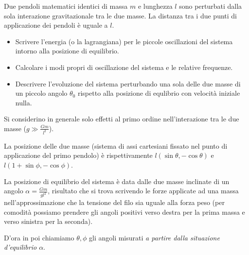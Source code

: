 \documentclass[../main.tex]{subfiles}
\begin{document}
\textex
Due pendoli matematici identici di massa $m$ e lunghezza $l$ sono perturbati dalla sola interazione gravitazionale tra le due masse. La distanza tra i due punti di applicazione dei pendoli è uguale a $l$. 
\begin{itemize}
\item Scrivere l'energia (o la lagrangiana) per le piccole oscillazioni del sistema intorno alla posizione di equilibrio. 
\item Calcolare i modi propri di oscillazione del sistema e le relative frequenze. 
\item Descrivere l'evoluzione del sistema perturbando una sola delle due masse di un piccolo angolo $\theta_0$ rispetto alla posizione di equlibrio con velocità iniziale nulla. 
\end{itemize} 
Si considerino in generale solo effetti al primo ordine nell'interazione tra le due masse ($g\gg\frac{Gm}{l^2}$). 

\solution
La posizione delle due masse (sistema di assi cartesiani fissato nel punto di applicazione del primo pendolo) è rispettivamente $l(\sin\theta,-\cos\theta)$ e $l(1+\sin\phi, -\cos\phi)$.

La posizione di equilibrio del sistema è data dalle due masse inclinate di un angolo $\alpha=\frac{Gm}{gl^2}$, risultato che si trova scrivendo le forze applicate ad una massa nell'approssimazione che la tensione del filo sia uguale alla forza peso (per comodità possiamo prendere gli angoli positivi verso destra per la prima massa e verso sinistra per la seconda).

D'ora in poi chiamiamo $\theta,\phi$ gli angoli misurati \emph{a partire dalla situazione d'equilibrio $\alpha$}.
\end{document}
